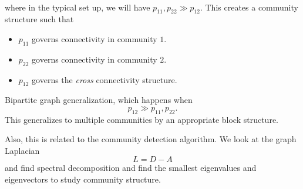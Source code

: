 \begin{itemize}
\[\begin{alignedat}{3}
		      \end{alignedat}
	      \]
	      where in the typical set up, we will have \(p_{11}, p_{22} \gg p_{12}\). This creates a community structure such that
	      \begin{itemize}
		      \item \(p_{11}\) governs connectivity in community \(1\).
		      \item \(p_{22}\) governs connectivity in community \(2\).
		      \item \(p_{12}\) governs the \emph{cross} connectivity structure.
	      \end{itemize}

	      \begin{remark}
		      Bipartite graph generalization, which happens when
		      \[
			      p_{12}\gg p_{11}, p_{22}.
		      \]
		      This generalizes to multiple communities by an appropriate block structure.

		      \begin{figure}[H]
			      \centering
			      \label{fig:bipartite-graph-generalization}
		      \end{figure}

		      Also, this is related to the community detection algorithm. We look at the graph Laplacian
		      \[
			      L = D - A
		      \]
		      and find spectral decomposition and find the smallest eigenvalues and eigenvectors to study community structure.
	      \end{remark}
\end{itemize}

\hr

